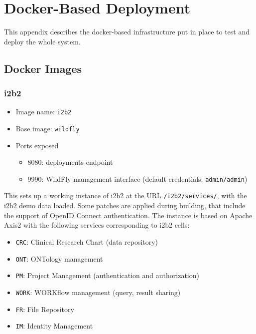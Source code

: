 \chapter{Docker-Based Deployment}
\label{sec:docker}

This appendix describes the docker-based infrastructure put in place to test and deploy the whole system.

\section{Docker Images}
\label{sec:docker-images}

\subsection{i2b2}
\begin{itemize}
    \item Image name: \verb|i2b2|
    \item Base image: \verb|wildfly|
    \item Ports exposed
        \begin{itemize}
        \item 8080: deployments endpoint
        \item 9990: WildFly management interface (default credentials: \verb|admin/admin|)
        \end{itemize}
\end{itemize}

This sets up a working instance of i2b2 at the URL \verb|/i2b2/services/|, with the i2b2 demo data loaded.
Some patches are applied during building, that include the support of OpenID Connect authentication.
The instance is based on Apache Axis2 with the following services corresponding to i2b2 cells:

\begin{itemize}
    \item \verb|CRC|: Clinical Research Chart (data repository)
    \item \verb|ONT|: ONTology management
    \item \verb|PM|: Project Management (authentication and authorization)
    \item \verb|WORK|: WORKflow management (query, result sharing)
    \item \verb|FR|: File Repository
    \item \verb|IM|: Identity Management
\end{itemize}


